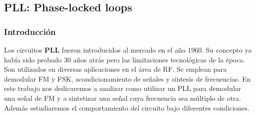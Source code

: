 

	\subsection{PLL: Phase-locked loops}
	\subsubsection{Introducción}
	Los circuitos \textbf{PLL} fueron introducidos al mercado en el año 1960. Su concepto ya había sido probado 30 años atrás pero las limitaciones tecnológicas de la época. Son utilizados en diversas aplicaciones en el área de RF. Se emplean para demodular FM y FSK, acondicionamiento de señales y síntesis de frecuencias. En este trabajo nos dedicaremos a analizar como utilizar un PLL para demodular una señal de FM y a sintetizar una señal cuya frecuencia sea múltiplo de otra. Además estudiaremos el comportamiento del circuito bajo diferentes condiciones.
